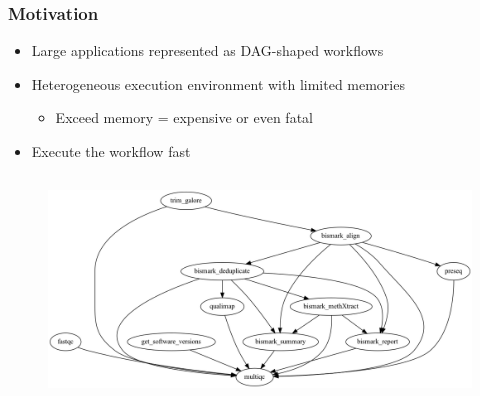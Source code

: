 \documentclass[xcolor=svgnames,titlepage,english,presentation]{beamer}
\begin{document}

\begin{frame}[t]
    \frametitle{Motivation}

    \begin{itemize}
        \item Large applications represented as DAG-shaped workflows
        \item Heterogeneous execution environment with limited memories
         \begin{itemize}
                  \item Exceed memory = expensive or even fatal
        \end{itemize}
        \item Execute the workflow fast
    \end{itemize}   

\begin{columns}
    \begin{figure}
            \centering
            \includegraphics[scale=0.25]{diagrams/images/methylseq-sparse.png}
            
        \end{figure}
\end{columns}
\end{frame}
\end{document}
